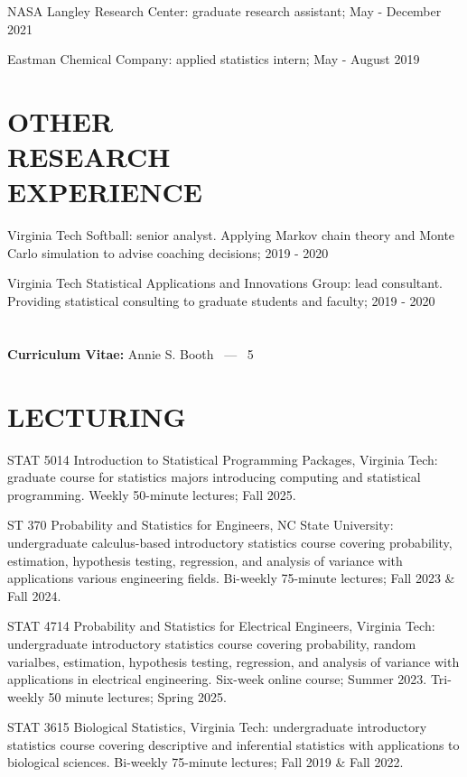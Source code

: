 \documentclass[margin,line,11pt]{res}
\begin{document}
\begin{resume}
{\sc NASA Langley Research Center}: graduate research assistant; May - December 2021

{\sc Eastman Chemical Company}: applied statistics intern; May - August 2019

\medskip
\section{OTHER \\ RESEARCH \\EXPERIENCE}

{\sc Virginia Tech Softball}: senior analyst.  Applying Markov chain theory and Monte Carlo simulation to advise coaching decisions; 2019 - 2020

{\sc Virginia Tech Statistical Applications and Innovations Group}: lead consultant.  Providing statistical consulting to graduate students and faculty; 2019 - 2020

\pagebreak
\section{}
\hfill {\bf Curriculum Vitae:} Annie S. Booth \  --- \  5
\medskip

\section{LECTURING}

{\sc STAT 5014 Introduction to Statistical Programming Packages, Virginia Tech}: graduate course for statistics majors introducing computing and statistical programming.  Weekly 50-minute lectures; Fall 2025.

{\sc ST 370 Probability and Statistics for Engineers, NC State University}: undergraduate calculus-based introductory statistics course covering probability, estimation, hypothesis testing, regression, and analysis of variance with applications various engineering fields. Bi-weekly 75-minute lectures; Fall 2023 \& Fall 2024.

{\sc STAT 4714 Probability and Statistics for Electrical Engineers, Virginia Tech}: undergraduate introductory statistics course covering probability, random varialbes, estimation, hypothesis testing, regression, and analysis of variance with applications in electrical engineering. Six-week online course; Summer 2023. Tri-weekly 50 minute lectures; Spring 2025.



{\sc STAT 3615 Biological Statistics, Virginia Tech}: undergraduate introductory statistics course covering descriptive and inferential statistics with applications to biological sciences. Bi-weekly 75-minute lectures; Fall 2019 \& Fall 2022.



\end{resume}
\end{document}
